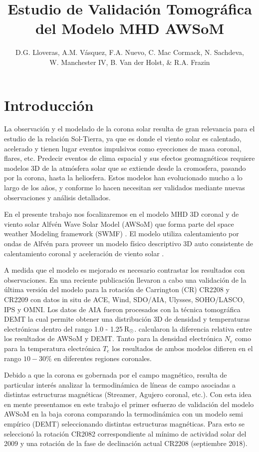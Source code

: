 \documentclass[baaa]{baaa}
\title{Estudio de Validación Tomográfica del Modelo MHD AWSoM}
\author{D.G. Lloveras\inst{1}, A.M. Vásquez\inst{1}, F.A. Nuevo\inst{1}, C. Mac Cormack\inst{1}, N. Sachdeva\inst{2},\\ W. Manchester IV\inst{2}, B. Van der Holst\inst{2}, \& R.A. Frazin\inst{2}}
\institute{
Insituto de Astronomía y Física del Espacio, CONICET--UBA, Argentina \and
Climate and Space Sciences and Engineering, Universidad de Michigan, EEUU.
}
\begin{document}
\maketitle

\section{Introducción}
\label{S_intro}
La observación y el modelado de la corona solar resulta de gran relevancia para el estudio de la relación Sol-Tierra, ya que es donde el viento solar es calentado, acelerado y tienen lugar eventos impulsivos como eyecciones de masa coronal, flares, etc.
Predecir eventos de clima espacial y sus efectos geomagnéticos requiere modelos 3D de la atmósfera solar que se extiende desde la cromosfera, pasando por la corona, hasta la heliosfera. Estos modelos han evolucionado mucho a lo largo de los años, y conforme lo hacen necesitan ser validados mediante nuevas observaciones y análisis detallados.

En el presente trabajo nos focalizaremos en el modelo MHD 3D coronal y de viento solar  Alfvén Wave Solar Model (AWSoM) que forma parte del space weather Modeling framework (SWMF) \citet{Toth_2012}. El modelo utiliza calentamiento por ondas de Alfvén para proveer un modelo físico descriptivo 3D auto consistente de calentamiento coronal y aceleración de viento solar \citep{sokolov_2013}  \citep{vander_2014}.

A medida que el modelo es mejorado es necesario contrastar los resultados con observaciones. En una reciente publicación \citet{sachdeva_2019} llevaron a cabo una validación de la última versión del modelo para la rotación de Carrington (CR) CR2208 y CR2209 con datos \rm{in situ} de ACE, Wind, SDO/AIA, Ulysses, SOHO/LASCO, IPS y OMNI. Los datos de AIA fueron procesados con la técnica tomográfica DEMT \citep{frazin_2009} la cual permite obtener una distribución 3D de densidad y temperaturas electrónicas dentro del rango 1.0 - 1.25$\,{\rm R_\odot}$. \citet{sachdeva_2019} calcularon la diferencia relativa entre los resultados de AWSoM y DEMT. Tanto para la densidad electrónica $N_e$ como para la temperatura electrónica $T_e$ los resultados de ambos modelos difieren en el rango $10-30\%$ en diferentes regiones coronales.


Debido a que la corona es gobernada por el campo magnético, resulta de particular interés analizar  la termodinámica de líneas de campo asociadas a distintas estructuras magnéticas (Streamer, Agujero coronal, etc.). Con esta idea en mente presentamos en este trabajo el primer esfuerzo de validación del modelo AWSoM en la baja corona comparando la termodinámica con un modelo semi empírico (DEMT) seleccionando distintas estructuras magnéticas. Para esto se seleccionó la rotación CR2082 correspondiente al mínimo de actividad solar del 2009 y una rotación de la fase de  declinación actual CR2208 (septiembre 2018).
\end{document}
